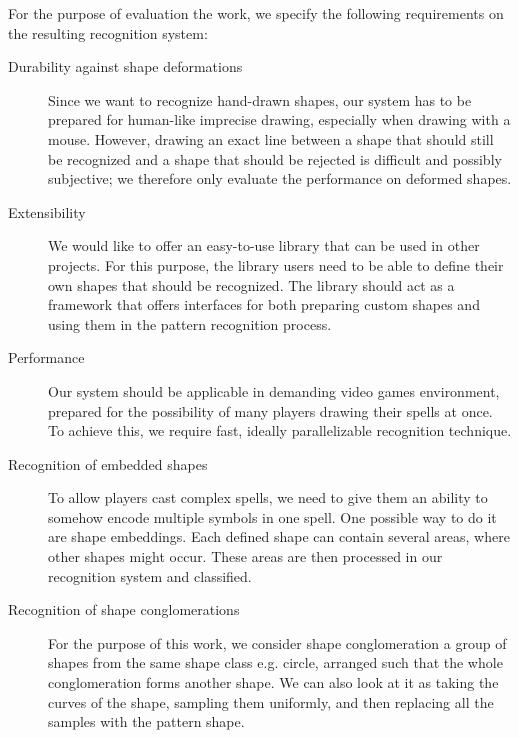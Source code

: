 For the purpose of evaluation the work, we specify the following requirements on the resulting recognition system:
\begin{description}

\item [Durability against shape deformations]
Since we want to recognize hand-drawn shapes, our system has to be prepared for human-like imprecise drawing, especially when drawing with a mouse. However, drawing an exact line between a shape that should still be recognized and a shape that should be rejected is difficult and possibly subjective; we therefore only evaluate the performance on deformed shapes.

\item [Extensibility]
We would like to offer an easy-to-use library that can be used in other projects. For this purpose, the library users need to be able to define their own shapes that should be recognized. The library should act as a framework that offers interfaces for both preparing custom shapes and using them in the pattern recognition process.

\item [Performance]
Our system should be applicable in demanding video games environment, prepared for the possibility of many players drawing their spells at once. To achieve this, we require fast, ideally parallelizable recognition technique.

\item [Recognition of embedded shapes]
To allow players cast complex spells, we need to give them an ability to somehow encode multiple symbols in one spell. One possible way to do it are shape embeddings. Each defined shape can contain several areas, where other shapes might occur. These areas are then processed in our recognition system and classified.

\item [Recognition of shape conglomerations]
For the purpose of this work, we consider shape conglomeration a group of shapes from the same shape class e.g. circle, arranged such that the whole conglomeration forms another shape. We can also look at it as taking the curves of the shape, sampling them uniformly, and then replacing all the samples with the pattern shape.
\end{description}

